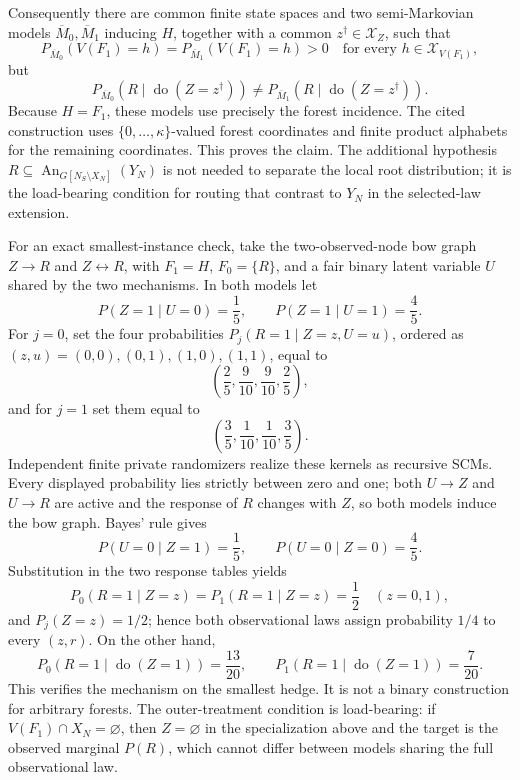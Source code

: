 Consequently there are common finite state spaces and two semi-Markovian models \(\overline M_0,\overline M_1\) inducing \(H\), together with a common \(z^\dagger\in\mathcal X_Z\), such that
\[
 P_{\overline M_0}(V(F_1)=h)
 =P_{\overline M_1}(V(F_1)=h)>0
 \quad\text{for every }h\in\mathcal X_{V(F_1)},
\]
but
\[
 P_{\overline M_0}(R\mid\operatorname{do}(Z=z^\dagger))
 \ne
 P_{\overline M_1}(R\mid\operatorname{do}(Z=z^\dagger)).
\]
Because \(H=F_1\), these models use precisely the forest incidence. The cited construction uses \(\{0,\ldots,\kappa\}\)-valued forest coordinates and finite product alphabets for the remaining coordinates. This proves the claim. The additional hypothesis \(R\subseteq\operatorname{An}_{G[N_S\setminus X_N]}(Y_N)\) is not needed to separate the local root distribution; it is the load-bearing condition for routing that contrast to \(Y_N\) in the selected-law extension.

For an exact smallest-instance check, take the two-observed-node bow graph \(Z\to R\) and \(Z\leftrightarrow R\), with \(F_1=H\), \(F_0=\{R\}\), and a fair binary latent variable \(U\) shared by the two mechanisms. In both models let
\[
 P(Z=1\mid U=0)=\frac15,
 \qquad
 P(Z=1\mid U=1)=\frac45.
\]
For \(j=0\), set the four probabilities \(P_j(R=1\mid Z=z,U=u)\), ordered as \((z,u)=(0,0),(0,1),(1,0),(1,1)\), equal to
\[
 \left(\frac25,\frac9{10},\frac9{10},\frac25\right),
\]
and for \(j=1\) set them equal to
\[
 \left(\frac35,\frac1{10},\frac1{10},\frac35\right).
\]
Independent finite private randomizers realize these kernels as recursive SCMs. Every displayed probability lies strictly between zero and one; both \(U\to Z\) and \(U\to R\) are active and the response of \(R\) changes with \(Z\), so both models induce the bow graph. Bayes' rule gives
\[
 P(U=0\mid Z=1)=\frac15,
 \qquad
 P(U=0\mid Z=0)=\frac45.
\]
Substitution in the two response tables yields
\[
 P_0(R=1\mid Z=z)=P_1(R=1\mid Z=z)=\frac12
 \quad (z=0,1),
\]
and \(P_j(Z=z)=1/2\); hence both observational laws assign probability \(1/4\) to every \((z,r)\). On the other hand,
\[
 P_0(R=1\mid\operatorname{do}(Z=1))=\frac{13}{20},
 \qquad
 P_1(R=1\mid\operatorname{do}(Z=1))=\frac7{20}.
\]
This verifies the mechanism on the smallest hedge. It is not a binary construction for arbitrary forests. The outer-treatment condition is load-bearing: if \(V(F_1)\cap X_N=\varnothing\), then \(Z=\varnothing\) in the specialization above and the target is the observed marginal \(P(R)\), which cannot differ between models sharing the full observational law.